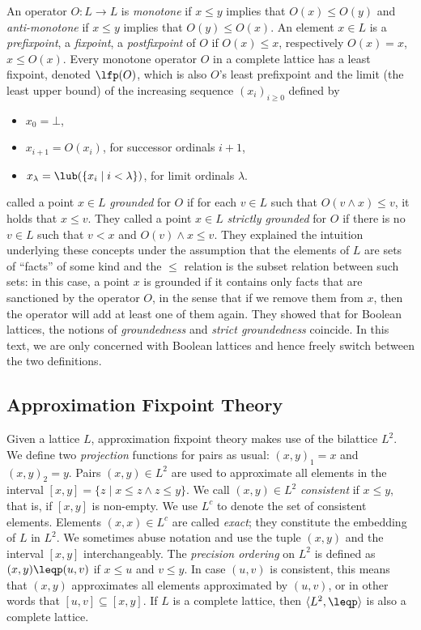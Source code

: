 An operator $O:L\to L$ is \emph{monotone} if $x\leq y$ implies that $O(x)\leq O(y)$ and \emph{anti-monotone} if $x\leq y$ implies that $O(y)\leq O(x)$. An element $x\in L$ is a \emph{prefixpoint}, a \emph{fixpoint}, a \emph{postfixpoint} of $O$ if $O(x)\leq x$, respectively $O(x)=x$, $x\leq O(x)$. 
Every monotone operator $O$ in a %
complete lattice has a least fixpoint, denoted $\lfp(O)$, which is also $O$'s least prefixpoint and the limit (the least upper bound) of the increasing sequence $(x_i)_{i\geq 0}$ defined by
\begin{itemize}
	\item $x_0=\bot$,
	\item $x_{i+1}=O(x_i)$, for successor ordinals $i+1$,
	\item $x_\lambda=\lub(\{x_i\mid i<\lambda\})$, for limit ordinals $\lambda$.
\end{itemize}


 called a point  $x\in L$ \emph{grounded} for $O$ if for each $v\in L$ such that $O(v\land
  x)\leq v$, it holds that $x\leq v$.   They called a point $x\in L$ \emph{strictly grounded} for $O$ if there is no $v\in L$ such that $v<x$ and $O(v)\land x \leq v$.
They explained the intuition underlying these concepts under the assumption that the elements of $L$ are sets of ``facts'' of some kind and the $\leq$ relation is the subset relation between such sets:
in this case, a point $x$ is grounded if it contains only facts that are sanctioned by the operator $O$, 
in the sense that if we remove them from $x$, then the operator will add at least one of them again. 
They showed that for Boolean lattices, the notions of \emph{groundedness} and \emph{strict groundedness} coincide. 
In this text, we are only concerned with Boolean lattices and hence freely switch between the two definitions. 



\subsection{Approximation Fixpoint Theory}


Given a lattice $L$, approximation fixpoint theory makes use of the bilattice 
$L^2$.  We define two \emph{projection} functions for pairs as usual:
$(x,y)_1=x$ and $(x,y)_2=y$.  Pairs $(x,y)\in L^2$ are used to
approximate all elements in the interval $[x,y] = \{z\mid x\leq
z\wedge z\leq y\}$. We call $(x,y)\in L^2$ \emph{consistent} if $x\leq
y$, that is, if $[x,y]$ is non-empty. We use $L^c$ to denote the set
of consistent elements. Elements $(x,x) \in L^c$ are called
\emph{exact}; they constitute the embedding of $L$ in $L^2$.  We sometimes abuse notation and use the tuple $(x,y)$
and the interval $[x,y]$ interchangeably.  The \emph{precision
  ordering} on $L^2$ is defined as $(x,y) \leqp (u,v)$ if $x\leq u$
and $v\leq y$. In case $(u,v)$ is consistent, this means that $(x,y)$
approximates all elements approximated by $(u,v)$, or in other words
that $[u,v]\subseteq [x,y]$.  If $L$ is a complete lattice, then
$\langle L^2,\leqp\rangle$ is also a complete lattice.
  

